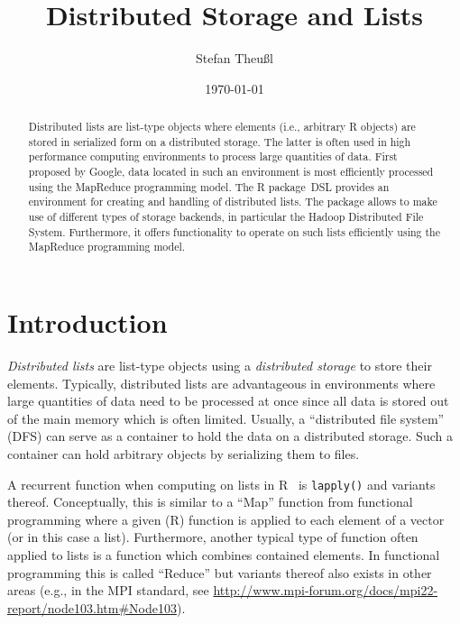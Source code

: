 \documentclass[fleqn]{article}
\date{\today}
\title{Distributed Storage and Lists}
\author{Stefan Theu\ss{}l}
\newcommand{\pkg}[1]{{\normalfont\fontseries{b}\selectfont #1}}
\let\code=\texttt
\let\proglang=\textsf
\begin{document}
\maketitle

\begin{abstract}
  Distributed lists are list-type objects where elements (i.e.,
  arbitrary \proglang{R} objects) are stored in serialized form on a
  distributed storage. The latter is often used in high performance
  computing environments to process large quantities of data. First
  proposed by Google, data located in such an environment is most
  efficiently processed using the MapReduce programming model. The
  \proglang{R} package~\pkg{DSL} provides an environment for creating
  and handling of distributed lists. The package allows to make use of
  different types of storage backends, in particular the Hadoop
  Distributed File System. Furthermore, it offers functionality to
  operate on such lists efficiently using the MapReduce programming
  model.
\end{abstract}


\section{Introduction}
\label{sec:introduction}

\emph{Distributed lists} are list-type objects using a
\emph{distributed storage} to store their elements. Typically,
distributed lists are advantageous in environments where large
quantities of data need to be processed at once since all data is
stored out of the main memory which is often limited. Usually, a
``distributed file system'' (DFS) can serve as a container to hold the
data on a distributed storage. Such a container can hold arbitrary
objects by serializing them to files.

A recurrent function when computing on lists in
\proglang{R}~\citep[][]{Rcore:2011} is \code{lapply()} and variants
thereof. Conceptually, this is similar to a ``Map'' function from
functional programming where a given (\proglang{R}) function is
applied to each element of a vector (or in this case a
list). Furthermore, another typical type of function often applied to
lists is a function which combines contained elements. In functional
programming this is called ``Reduce'' but variants thereof also exists
in other areas (e.g., in the MPI standard, see
\url{http://www.mpi-forum.org/docs/mpi22-report/node103.htm#Node103}).
\end{document}
